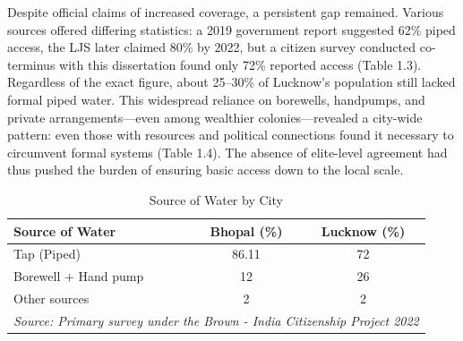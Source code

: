 Despite official claims of increased coverage, a persistent gap remained. Various sources offered differing statistics: a 2019 government report suggested 62\% piped access, the LJS later claimed 80\% by 2022, but a citizen survey conducted co-terminus with this dissertation found only 72\% reported access (Table 1.3). Regardless of the exact figure, about 25–30\% of Lucknow’s population still lacked formal piped water. This widespread reliance on borewells, handpumps, and private arrangements—even among wealthier colonies—revealed a city-wide pattern:  even those with resources and political connections found it necessary to circumvent formal systems (Table 1.4). The absence of elite-level agreement had thus pushed the burden of ensuring basic access down to the local scale.

\begin{table}[ht]
\centering
\renewcommand{\arraystretch}{1.5} %
\setlength{\tabcolsep}{8pt} %
\begin{tabular}{|p{5cm}|c|c|}
\hline
\textbf{Source of Water} & \textbf{Bhopal (\%)} & \textbf{Lucknow (\%)} \\ \hline
Tap (Piped) & 86.11 & 72 \\ \hline
Borewell + Hand pump & 12 & 26 \\ \hline
Other sources & 2 & 2 \\ \hline
\multicolumn{3}{l}{\textit{Source: Primary survey under the Brown - India Citizenship Project 2022}} \\ %
\end{tabular}
\caption{Source of Water by City}
\label{tab:water_sources}
\end{table}

